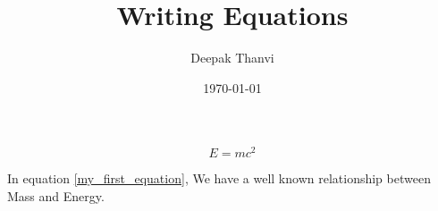 \documentclass{article}
\title{Writing Equations}
\author{Deepak Thanvi}
\date{\today}
\begin{document}
\maketitle


\begin{equation}\label{my_first_equation} %
	E = mc^2
\end{equation}

In equation \ref{my_first_equation}, We have a well known relationship between Mass and Energy.
\end{document}
